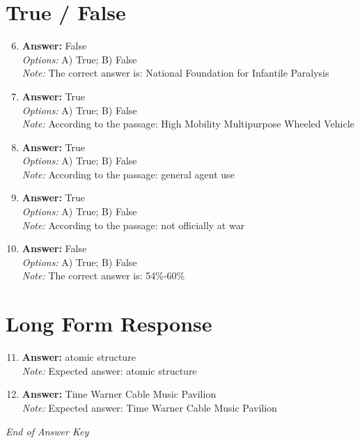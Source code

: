 \documentclass[12pt]{article}
\begin{document}
\section*{True / False}
\begin{enumerate}[label=\arabic*.]
\setcounter{enumi}{5}
\item \textbf{Answer:} False
\\ \textit{Options:} A) True; B) False
\\ \textit{Note:} The correct answer is: National Foundation for Infantile Paralysis
\item \textbf{Answer:} True
\\ \textit{Options:} A) True; B) False
\\ \textit{Note:} According to the passage: High Mobility Multipurpose Wheeled Vehicle
\item \textbf{Answer:} True
\\ \textit{Options:} A) True; B) False
\\ \textit{Note:} According to the passage: general agent use
\item \textbf{Answer:} True
\\ \textit{Options:} A) True; B) False
\\ \textit{Note:} According to the passage: not officially at war
\item \textbf{Answer:} False
\\ \textit{Options:} A) True; B) False
\\ \textit{Note:} The correct answer is: 54\%-60\%
\end{enumerate}

\section*{Long Form Response}
\begin{enumerate}[label=\arabic*.]
\setcounter{enumi}{10}
\item \textbf{Answer:} atomic structure
\\ \textit{Note:} Expected answer: atomic structure
\item \textbf{Answer:} Time Warner Cable Music Pavilion
\\ \textit{Note:} Expected answer: Time Warner Cable Music Pavilion
\end{enumerate}

\vfill
\noindent\textit{End of Answer Key}
\end{document}
